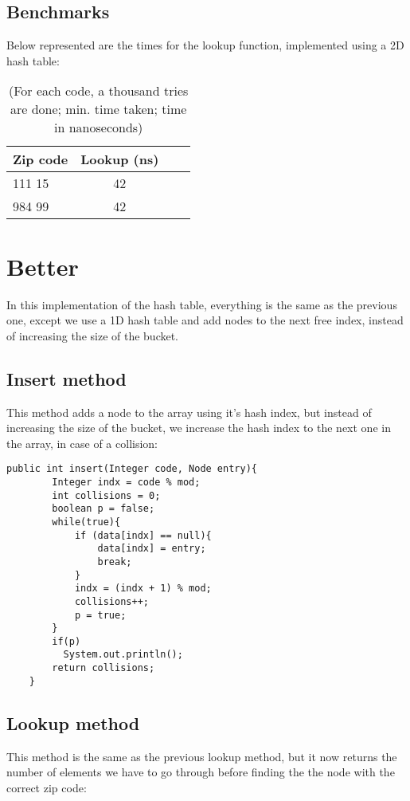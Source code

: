 \documentclass[a4paper,11pt]{article}
\begin{document}
\subsection*{Benchmarks}
Below represented are the times for the lookup function, implemented using a 2D hash table:

\begin{table}[h]
\begin{center}
\begin{tabular}{l|c|c|c}
\textbf{Zip code} & \textbf{Lookup (ns)}\\
\hline
  111 15      &  42\\
  984 99      &  42\\
\end{tabular}
\caption{(For each code, a thousand tries are done; min. time taken; time in nanoseconds)}
\label{tab:table1}
\end{center}
\end{table}


\section*{Better}
In this implementation of the hash table, everything is the same as the previous one, except we use a 1D hash table and add nodes to the next free index, instead of increasing the size of the bucket.

\subsection*{Insert method}
 This method adds a node to the array using it's hash index, but instead of increasing the size of the bucket, we increase the hash index to the next one in the array, in case of a collision:
 
\begin{verbatim}
public int insert(Integer code, Node entry){
        Integer indx = code % mod; 
        int collisions = 0;
        boolean p = false;
        while(true){
            if (data[indx] == null){
                data[indx] = entry;
                break;
            }
            indx = (indx + 1) % mod;
            collisions++;
            p = true;
        }
        if(p)
          System.out.println();
        return collisions;
    }
\end{verbatim}

\subsection*{Lookup method}
This method is the same as the previous lookup method, but it now returns the number of elements we have to go through before finding the the node with the correct zip code:
 
\end{document}
